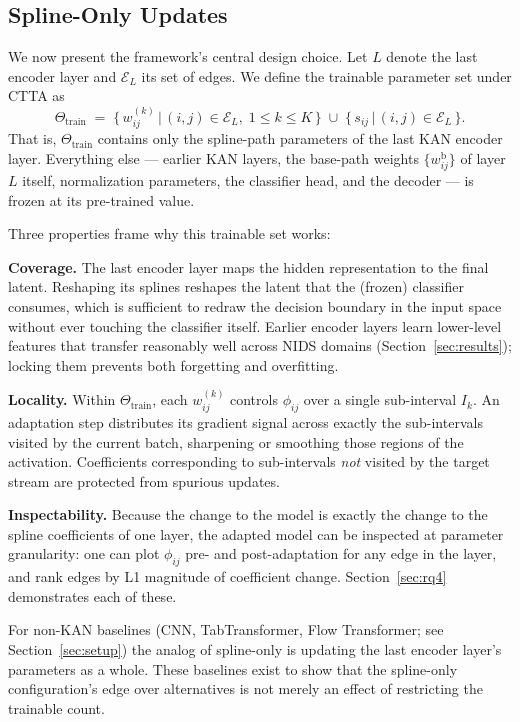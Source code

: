 \documentclass[10pt, conference, letterpaper]{IEEEtran}
\begin{document}
\subsection{Spline-Only Updates}
\label{sec:spline-only}

We now present the framework's central design choice. Let $L$ denote the last encoder layer and $\mathcal{E}_L$ its set of edges. We define the trainable parameter set under CTTA as
\begin{equation}
\label{eq:theta-train}
\Theta_{\text{train}} \;=\; \Big\{\, w_{ij}^{(k)} \,\Big|\, (i,j) \in \mathcal{E}_L,\; 1 \leq k \leq K \,\Big\} \;\cup\; \Big\{\, s_{ij} \,\Big|\, (i,j) \in \mathcal{E}_L \,\Big\}.
\end{equation}
That is, $\Theta_{\text{train}}$ contains only the spline-path parameters of the last KAN encoder layer. Everything else --- earlier KAN layers, the base-path weights $\{w^{\text{b}}_{ij}\}$ of layer $L$ itself, normalization parameters, the classifier head, and the decoder --- is frozen at its pre-trained value.

Three properties frame why this trainable set works:

\textbf{Coverage.} The last encoder layer maps the hidden representation to the final latent. Reshaping its splines reshapes the latent that the (frozen) classifier consumes, which is sufficient to redraw the decision boundary in the input space without ever touching the classifier itself. Earlier encoder layers learn lower-level features that transfer reasonably well across NIDS domains (Section~\ref{sec:results}); locking them prevents both forgetting and overfitting.

\textbf{Locality.} Within $\Theta_{\text{train}}$, each $w_{ij}^{(k)}$ controls $\phi_{ij}$ over a single sub-interval $I_k$. An adaptation step distributes its gradient signal across exactly the sub-intervals visited by the current batch, sharpening or smoothing those regions of the activation. Coefficients corresponding to sub-intervals \emph{not} visited by the target stream are protected from spurious updates.

\textbf{Inspectability.} Because the change to the model is exactly the change to the spline coefficients of one layer, the adapted model can be inspected at parameter granularity: one can plot $\phi_{ij}$ pre- and post-adaptation for any edge in the layer, and rank edges by L1 magnitude of coefficient change. Section~\ref{sec:rq4} demonstrates each of these.

For non-KAN baselines (CNN, TabTransformer, Flow Transformer; see Section~\ref{sec:setup}) the analog of spline-only is updating the last encoder layer's parameters as a whole. These baselines exist to show that the spline-only configuration's edge over alternatives is not merely an effect of restricting the trainable count.
\end{document}
